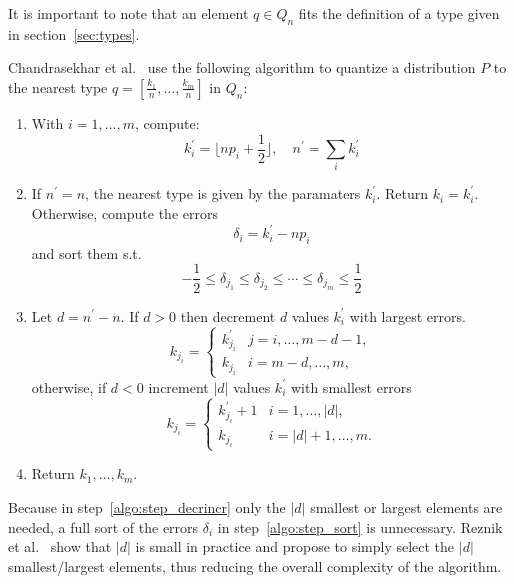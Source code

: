It is important to note that an element $q \in Q_n$ fits the definition of a type given in section~\ref{sec:types}.

Chandrasekhar et al.\ \cite{chog2011} use the following algorithm to quantize a distribution $P$ to the nearest type $q = [\frac{k_1}{n},\ldots,\frac{k_m}{n}]$ in $Q_n$:
\begin{enumerate}

\item With $i=1,\ldots,m$, compute: \begin{displaymath}
k_i^\prime = \lfloor np_i+\frac{1}{2} \rfloor,\quad n^\prime=\sum_i k_i^\prime
\end{displaymath}

\item \label{algo:step_sort} If $n^\prime = n$, the nearest type is given by the paramaters $k_i^\prime$. Return $k_i = k_i^\prime$. Otherwise, compute the errors
\begin{displaymath}
\delta_i = k_i^\prime - np_i
\end{displaymath}
 and sort them s.t.
\begin{displaymath}
-\frac{1}{2} \leq \delta_{j_1} \leq \delta_{j_2} \leq \cdots \leq \delta_{j_m} \leq \frac{1}{2}
\end{displaymath}

\item \label{algo:step_decrincr} Let $d = n^\prime - n$. If $d > 0$ then decrement $d$ values $k_i^\prime$ with largest errors.
\[
k_{j_i} = \begin{cases}
k_{j_i}^\prime & j = i,\ldots,m-d-1, \\
k_{j_i} & i=m-d,\ldots,m,
\end{cases}
\]
otherwise, if $d < 0$ increment $\left|d\right|$ values $k_i^\prime$ with smallest errors
\[
k_{j_i} = \begin{cases}
k_{j_i}^\prime + 1 & i = 1,\ldots,\left|d\right|, \\
k_{j_i} & i=\left|d\right|+1,\ldots,m.
\end{cases}
\]

\item Return $k_1,\ldots,k_m$.
\end{enumerate}

Because in step~\ref{algo:step_decrincr} only the $\left|d\right|$ smallest or largest elements are needed, a full sort of the errors $\delta_i$ in step~\ref{algo:step_sort} is unnecessary. Reznik et al.\ \cite{fastchog} show that $\left|d\right|$ is small in practice and propose to simply select the $\left|d\right|$ smallest/largest elements, thus reducing the overall complexity of the algorithm.


